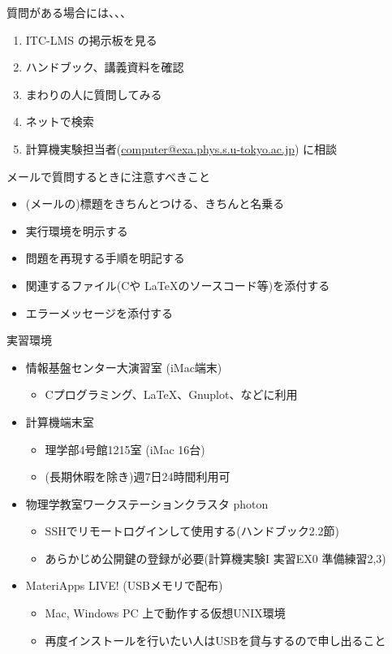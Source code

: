 \begin{frame}[t]{質問がある場合には、、、}
  \begin{enumerate}
  \item ITC-LMS の掲示板を見る
  \item ハンドブック、講義資料を確認
  \item まわりの人に質問してみる
  \item ネットで検索
  \item 計算機実験担当者(\href{mailto:computer@exa.phys.s.u-tokyo.ac.jp}{computer@exa.phys.s.u-tokyo.ac.jp}) に相談
  \end{enumerate}
  メールで質問するときに注意すべきこと
  \begin{itemize}
  \item (メールの)標題をきちんとつける、きちんと名乗る
  \item 実行環境を明示する
  \item 問題を再現する手順を明記する
  \item 関連するファイル(Cや \LaTeX のソースコード等)を添付する
  \item エラーメッセージを添付する
  \end{itemize}
\end{frame}

\begin{frame}[t,fragile]{実習環境}
  \begin{itemize}
    \setlength{\itemsep}{1em}
  \item 情報基盤センター大演習室 (iMac端末)
    \begin{itemize}
    \item Cプログラミング、\LaTeX、Gnuplot、などに利用
    \end{itemize}
  \item 計算機端末室
    \begin{itemize}
    \item 理学部4号館1215室 (iMac 16台)
    \item {\color{red}(長期休暇を除き)週7日24時間利用可}
    \end{itemize}
  \item 物理学教室ワークステーションクラスタ photon
    \begin{itemize}
    \item SSHでリモートログインして使用する(ハンドブック2.2節)
    \item あらかじめ公開鍵の登録が必要(計算機実験I 実習EX0 準備練習2,3)
    \end{itemize}
  \item MateriApps LIVE! (USBメモリで配布)
    \begin{itemize}
    \item Mac, Windows PC 上で動作する仮想UNIX環境
    \item 再度インストールを行いたい人はUSBを貸与するので申し出ること
    \end{itemize}
  \end{itemize}
\end{frame}
